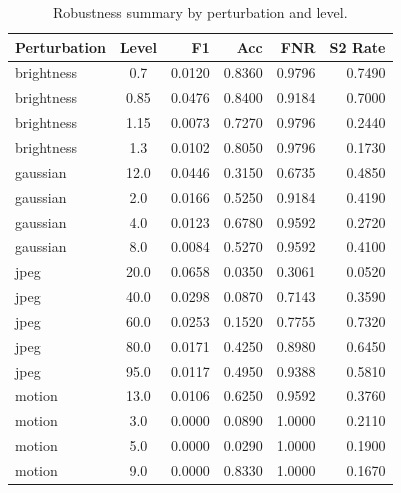 \begin{table}[h]
  \centering
  \caption{Robustness summary by perturbation and level.}\label{tab:robustness_table}
  \begin{tabular}{lcrrrr}\toprule
 Perturbation & Level & F1 & Acc & FNR & S2 Rate \\ \midrule
  brightness & 0.7 & 0.0120 & 0.8360 & 0.9796 & 0.7490 \\ 
  brightness & 0.85 & 0.0476 & 0.8400 & 0.9184 & 0.7000 \\ 
  brightness & 1.15 & 0.0073 & 0.7270 & 0.9796 & 0.2440 \\ 
  brightness & 1.3 & 0.0102 & 0.8050 & 0.9796 & 0.1730 \\ 
  gaussian & 12.0 & 0.0446 & 0.3150 & 0.6735 & 0.4850 \\ 
  gaussian & 2.0 & 0.0166 & 0.5250 & 0.9184 & 0.4190 \\ 
  gaussian & 4.0 & 0.0123 & 0.6780 & 0.9592 & 0.2720 \\ 
  gaussian & 8.0 & 0.0084 & 0.5270 & 0.9592 & 0.4100 \\ 
  jpeg & 20.0 & 0.0658 & 0.0350 & 0.3061 & 0.0520 \\ 
  jpeg & 40.0 & 0.0298 & 0.0870 & 0.7143 & 0.3590 \\ 
  jpeg & 60.0 & 0.0253 & 0.1520 & 0.7755 & 0.7320 \\ 
  jpeg & 80.0 & 0.0171 & 0.4250 & 0.8980 & 0.6450 \\ 
  jpeg & 95.0 & 0.0117 & 0.4950 & 0.9388 & 0.5810 \\ 
  motion & 13.0 & 0.0106 & 0.6250 & 0.9592 & 0.3760 \\ 
  motion & 3.0 & 0.0000 & 0.0890 & 1.0000 & 0.2110 \\ 
  motion & 5.0 & 0.0000 & 0.0290 & 1.0000 & 0.1900 \\ 
  motion & 9.0 & 0.0000 & 0.8330 & 1.0000 & 0.1670 \\ 
  \bottomrule\end{tabular}\end{table}
